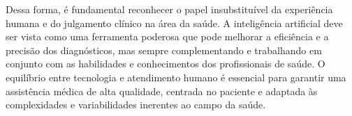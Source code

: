 Dessa forma, é fundamental reconhecer o papel insubstituível da experiência humana e do julgamento clínico na área da saúde. A inteligência artificial deve ser vista como uma ferramenta poderosa que pode melhorar a eficiência e a precisão dos diagnósticos, mas sempre complementando e trabalhando em conjunto com as habilidades e conhecimentos dos profissionais de saúde. O equilíbrio entre tecnologia e atendimento humano é essencial para garantir uma assistência médica de alta qualidade, centrada no paciente e adaptada às complexidades e variabilidades inerentes ao campo da saúde. 


